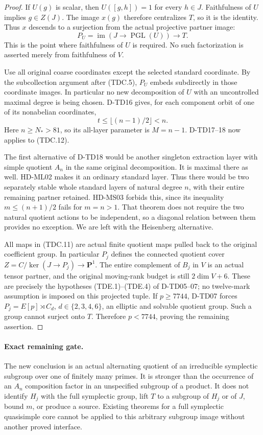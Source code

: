 \begin{proof}
If $U(g)$ is scalar, then $U([g,h])=1$ for every $h\in J$.
Faithfulness of $U$ implies $g\in Z(J)$. The image $x(g)$
therefore centralizes $T$, so it is the identity. Thus $x$
descends to a surjection from the actual projective partner
image:
\[
         P_U=\operatorname{im}(J\to\operatorname{PGL}(U))
                      \longrightarrow T.
 \tag{TDC.12}
\]
This is the point where faithfulness of $U$ is required.
No such factorization is asserted merely from faithfulness of $V$.

Use all original coarse coordinates except the selected standard
coordinate. By the subcollection argument after (TDC.5), $P_U$
embeds subdirectly in those coordinate images. In particular no
new decomposition of $U$ with an uncontrolled maximal degree
is being chosen. D-TD16 gives, for each component orbit of one
of its nonabelian coordinates,
\[
                  t\le\lfloor(n-1)/2\rfloor<n.
 \tag{TDC.13}
\]
Here $n\ge N_*>81$, so its all-layer parameter is $M=n-1$.
D-TD17--18 now applies to (TDC.12).

The first alternative of D-TD18 would be another singleton
extraction layer with simple quotient $A_n$ in the same original
decomposition. It is maximal there as well. HD-ML02 makes it
an ordinary standard layer. Thus there would be two separately
stable whole standard layers of natural degree $n$, with their
entire remaining partner retained. HD-MS03 forbids this, since
its inequality $m\le(n+1)/2$ fails for $m=n>1$.
That theorem does not require the two natural quotient actions
to be independent, so a diagonal relation between them provides
no exception. We are left with the Heisenberg alternative.

All maps in (TDC.11) are actual finite quotient maps pulled back
to the original coefficient group. In particular $P_j$ defines
the connected quotient cover
$Z=C/\ker(J\to P_j)\to\mathbf P^1$.
The entire complement of $B_j$ in $V$ is an actual tensor partner,
and the original moving-rank budget is still $2\dim V+6$.
These are precisely the hypotheses (TDE.1)--(TDE.4) of D-TD05--07;
no twelve-mark assumption is imposed on this projected tuple.
If $p\ge7744$, D-TD07 forces
$P_j=E[p]\rtimes C_d$, $d\in\{2,3,4,6\}$, an elliptic and
solvable quotient group. Such a group cannot surject onto $T$.
Therefore $p<7744$, proving the remaining assertion.
\end{proof}

\paragraph{Exact remaining gate.}
The new conclusion is an actual alternating quotient of an irreducible
symplectic subgroup over one of finitely many primes. It is stronger
than the occurrence of an $A_n$ composition factor in an unspecified
subgroup of a product. It does not identify $H_j$ with the full
symplectic group, lift $T$ to a subgroup of $H_j$ or of $J$, bound
$m$, or produce a source. Existing theorems for a full symplectic
quasisimple core cannot be applied to this arbitrary subgroup image
without another proved interface.

